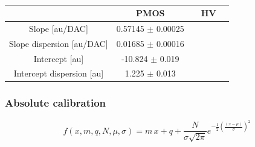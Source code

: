         \begin{table}
            \begin{center}
            \begin{tabular}{| c |  c | c | c |c |}
            \hline
             & PMOS & & HV \\
            \hline
            \hline
            Slope [au/DAC] & 0.57145 $\pm$ 0.00025 \\
            Slope dispersion [au/DAC] &  0.01685 $\pm$ 0.00016\\
            Intercept [au] & -10.824 $\pm$ 0.019 \\
            Intercept dispersion [au] & 1.225 $\pm$ 0.013\\
            \hline
            \end{tabular}
            \caption{}
            \label{tab:}
            \end{center}
        \end{table}        

        \subsubsection{Absolute calibration}
        \begin{equation}
            f(x, m, q, N, \mu, \sigma) = m\,x + q + \frac{N}{\sigma \sqrt{2\pi}} e^{-\frac{1}{2}(\frac{(x-\mu)}{\sigma})^2}
        \end{equation}   
         
